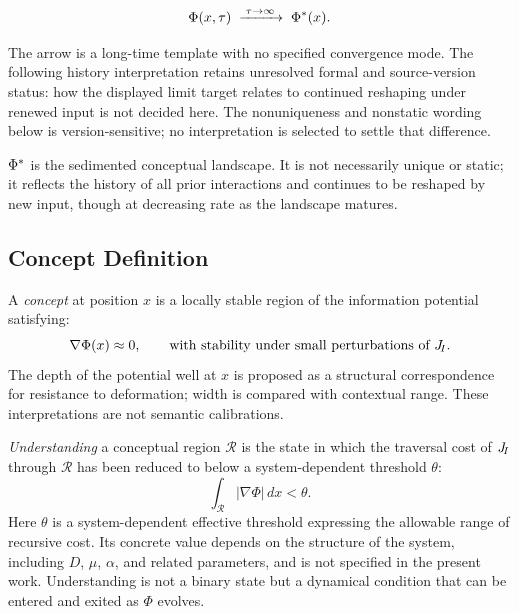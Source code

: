 \begin{equation}
  \Phi(x,\tau) \;\xrightarrow{\;\tau\to\infty\;}\; \Phi^{*}(x).
  \label{eq:sedimentation}
\end{equation}

The arrow is a long-time template with no specified convergence mode.
The following history interpretation retains unresolved formal and
source-version status: how the displayed limit target relates to continued
reshaping under renewed input is not decided here. The nonuniqueness and
nonstatic wording below is version-sensitive; no interpretation is selected
to settle that difference.

$\Phi^{*}$ is the sedimented conceptual landscape.
It is not necessarily unique or static; it reflects the history of
all prior interactions and continues to be reshaped by new input,
though at decreasing rate as the landscape matures.

\subsection{Concept Definition}

\begin{definition}[Concept]
A \emph{concept} at position $x$ is a locally stable region of the
information potential satisfying:
\begin{equation}
  \nabla\Phi(x) \approx 0, \qquad
  \text{with stability under small perturbations of } J_{\!I}.
  \label{eq:concept}
\end{equation}
The depth of the potential well at $x$ is proposed as a structural
correspondence for resistance to deformation; width is compared with
contextual range. These interpretations are not semantic calibrations.
\end{definition}

\begin{definition}[Understanding]
\emph{Understanding} a conceptual region $\mathcal{R}$ is the state
in which the traversal cost of $J_{\!I}$ through $\mathcal{R}$ has been
reduced to below a system-dependent threshold $\theta$:
\begin{equation}
  \int_{\mathcal{R}} |\nabla\Phi|\,dx < \theta.
  \label{eq:understanding}
\end{equation}
Here $\theta$ is a system-dependent effective threshold expressing the
allowable range of recursive cost.
Its concrete value depends on the structure of the system, including
$D$, $\mu$, $\alpha$, and related parameters, and is not specified in
the present work.
Understanding is not a binary state but a dynamical condition that can
be entered and exited as $\Phi$ evolves.
\end{definition}

